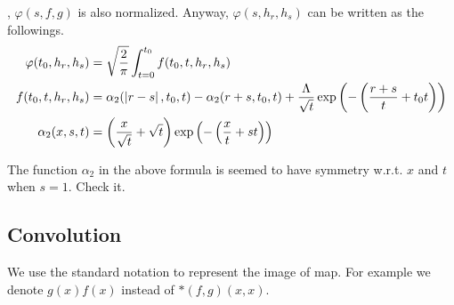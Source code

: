 , $\varphi(s,f,g)$ is also normalized.
Anyway, $\varphi(s,h_r,h_s)$ can be written as the followings.
\begin{equation}\begin{split}
	\varphi(t_0,h_r,h_s) &= \sqrt{\frac{2}{\pi}}\int_{t=0}^{t_0}f(t_0,t,h_r,h_s) \\
	f(t_0,t,h_r,h_s) &= \alpha_2(\left|{r-s}\right|,t_0,t) - \alpha_2(r+s,t_0,t) + \frac{\Lambda}{\sqrt{t}}\exp\left({-\left({\frac{r+s}{t}+t_0t}\right)}\right) \\
	\alpha_2(x,s,t) &= \left({\frac{x}{\sqrt{t}} + \sqrt{t}}\right)\exp\left({-\left({\frac{x}{t}+st}\right)}\right) \\
\end{split}\end{equation}
\begin{todo}[symmetry]
The function $\alpha_2$ in the above formula is seemed to have symmetry w.r.t.
$x$ and $t$ when $s=1$. Check it.
\end{todo}

\subsection{Convolution}
We use the standard notation to represent the image of map. 
For example we denote $g(x)f(x)$ instead of $*(f,g)(x,x)$.

